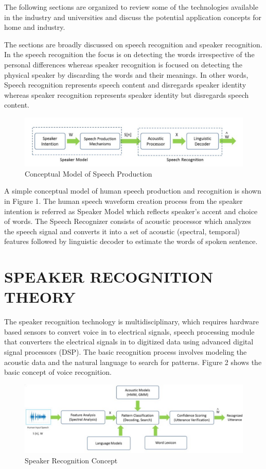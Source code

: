\documentclass[sigconf]{acmart}
\begin{document}
The following sections are organized to review some of the technologies available in the industry and universities and discuss the potential application concepts for home and industry.
\par\null\par
The sections are broadly discussed on speech recognition and speaker recognition. In the speech recognition the focus is on detecting the words irrespective of the personal differences whereas speaker recognition is focused on detecting the physical speaker by discarding the words and their meanings. In other words, Speech recognition represents speech content and disregards speaker identity whereas speaker recognition represents speaker identity but disregards speech content.

\begin{figure}
\includegraphics[width=1.0\columnwidth]{images/speechrecognition.pdf}
\caption{Conceptual Model of Speech Production}
\end{figure}

A simple conceptual model of human speech production and recognition is shown in Figure 1. The human speech waveform creation process from the speaker intention is referred as Speaker Model which reflects speaker's accent and choice of words. The Speech Recognizer consists of acoustic processor which analyzes the speech signal and converts it into a set of acoustic (spectral, temporal) features followed by linguistic decoder to estimate the words of spoken sentence.

\section{SPEAKER RECOGNITION THEORY}
The speaker recognition technology is multidisciplinary, which requires hardware based sensors to convert voice in to electrical signals, speech processing module that converters the electrical signals in to digitized data using advanced digital signal processors (DSP). The basic recognition process involves modeling the acoustic data and the natural language to search for patterns. Figure 2 shows the basic concept of voice recognition.

\begin{figure}
\includegraphics[width=1.0\columnwidth]{images/speakerrecognition.pdf}
\caption{Speaker Recognition Concept}
\end{figure}
\end{document}
